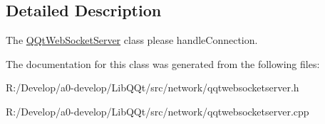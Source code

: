 \subsection{Detailed Description}
The \mbox{\hyperlink{class_q_qt_web_socket_server}{Q\+Qt\+Web\+Socket\+Server}} class please handle\+Connection. 

The documentation for this class was generated from the following files\+:\begin{DoxyCompactItemize}
\item 
R\+:/\+Develop/a0-\/develop/\+Lib\+Q\+Qt/src/network/qqtwebsocketserver.\+h\item 
R\+:/\+Develop/a0-\/develop/\+Lib\+Q\+Qt/src/network/qqtwebsocketserver.\+cpp\end{DoxyCompactItemize}
